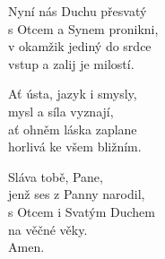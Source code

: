 \begin{translatioMulticol}{3}
Nyní nás Duchu přesvatý\\
s Otcem a Synem pronikni,\\
v okamžik jediný do srdce\\
vstup a zalij je milostí.\columnbreak

Ať ústa, jazyk i smysly,\\
mysl a síla vyznají,\\
ať ohněm láska zaplane\\
horlivá ke všem bližním.\columnbreak

Sláva tobě, Pane,\\
jenž ses z Panny narodil,\\
s Otcem i Svatým Duchem\\
na věčné věky.\\
Amen.
\end{translatioMulticol}
